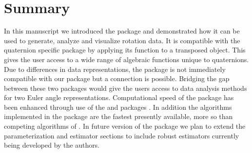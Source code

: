 \section{Summary}

In this manuscript we introduced the  package and demonstrated how it can be used to generate, analyze and visualize rotation data.  It is compatible with the quaternion specific  package by applying its  function to a transposed  object.  This gives the user access to a wide range of algebraic functions unique to quaternions.  Due to differences in data representations, the  package is not immediately compatible with our package but a connection is possible.  Bridging the gap between these two packages would give the  users access to data analysis methods for two Euler angle representations.  Computational speed of the  package has been enhanced through use of the   and  packages \citep*{eddelbuettel2013,eddelbuettel2013b}.  In addition the algorithms implemented in the  package are the fastest presently available, more so than competing algorithms of \cite{hartley2013}.  In future version of the package we plan to extend the parameterization and estimator sections to include robust estimators currently being developed by the authors.  



\address{Bryan Stanfill\\
  Department of Statistics\\
  Iowa State University\\
  Ames, IA 50011}\\

\address{Heike Hofmann\\
  Department of Statistics\\
  Iowa State University\\
  Ames, IA 50011}\\

\address{Ulrike Genschel\\
  Department of Statistics\\
  Iowa State University\\
  Ames, IA 50011}\\

